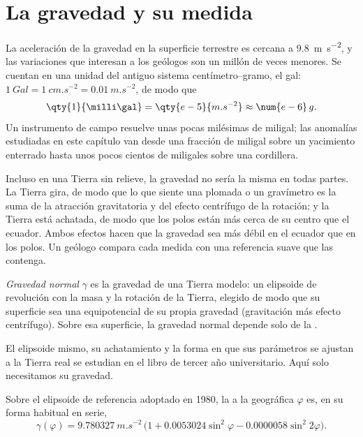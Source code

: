 \section{La gravedad y su medida}

La aceleración de la gravedad en la superficie terrestre es cercana a \qty{9.8}{m.s^{-2}}, y las variaciones que interesan a los
geólogos son un millón de veces menores. Se cuentan en una unidad del antiguo sistema centímetro--gramo, el gal: $\qty{1}{Gal} = \qty{1}{cm.s^{-2}} = \qty{0.01}{m.s^{-2}}$, de modo que
\[
  \qty{1}{\milli\gal} = \qty{e-5}{m.s^{-2}} \approx \num{e-6}\,g .
\]
Un instrumento de campo resuelve unas pocas milésimas de miligal; las anomalías estudiadas en este capítulo van desde una fracción de
miligal sobre un yacimiento enterrado hasta unos pocos cientos de miligales sobre una cordillera.

Incluso en una Tierra sin relieve, la gravedad no sería la misma en todas partes. La Tierra gira, de modo que lo que siente una
plomada o un gravímetro es la suma de la atracción gravitatoria y del efecto centrífugo de la rotación; y la Tierra está achatada,
de modo que los polos están más cerca de su centro que el ecuador. Ambos efectos hacen que la gravedad sea más débil en el ecuador
que en los polos. Un geólogo compara cada medida con una referencia suave que las contenga.

\begin{definition}\label{def:b1:isostasy-gravity:normal-gravity}
\emph{Gravedad normal} $\gamma$ es la gravedad de una Tierra modelo: un elipsoide de revolución con la masa y
la rotación de la Tierra, elegido de modo que su superficie sea una equipotencial de su propia gravedad (gravitación más efecto
centrífugo). Sobre esa superficie, la gravedad normal depende solo de la .
\end{definition}

El elipsoide mismo, su achatamiento y la forma en que sus parámetros se ajustan a la Tierra real se estudian en el libro de tercer
año universitario. Aquí solo necesitamos su gravedad.

\begin{proposition}\label{prop:b1:isostasy-gravity:normal-formula}
Sobre el elipsoide de referencia adoptado en 1980, la  a la  geográfica $\varphi$ es, en su forma habitual en
serie,
\[
  \gamma(\varphi) = \qty{9.780327}{m.s^{-2}}\,\bigl(1 + 0.0053024\sin^2\varphi
  - 0.0000058\sin^2 2\varphi\bigr).
\]
\end{proposition}
\admitted

